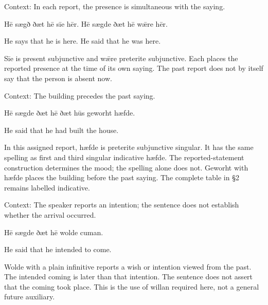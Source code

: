 Context: In each report, the presence is simultaneous with the saying.

Hē sægð ðæt hē sīe hēr. Hē sægde ðæt hē wǣre hēr.

He says that he is here. He said that he was here.

Sīe is present subjunctive and wǣre preterite subjunctive. Each places the reported presence at the time of its own saying. The past report does not by itself say that the person is absent now.

Context: The building precedes the past saying.

Hē sægde ðæt hē ðæt hūs geworht hæfde.

He said that he had built the house.

In this assigned report, hæfde is preterite subjunctive singular. It has the same spelling as first and third singular indicative hæfde. The reported-statement construction determines the mood; the spelling alone does not. Geworht with hæfde places the building before the past saying. The complete table in §2 remains labelled indicative.

Context: The speaker reports an intention; the sentence does not establish whether the arrival occurred.

Hē sægde ðæt hē wolde cuman.

He said that he intended to come.

Wolde with a plain infinitive reports a wish or intention viewed from the past. The intended coming is later than that intention. The sentence does not assert that the coming took place. This is the use of willan required here, not a general future auxiliary.

